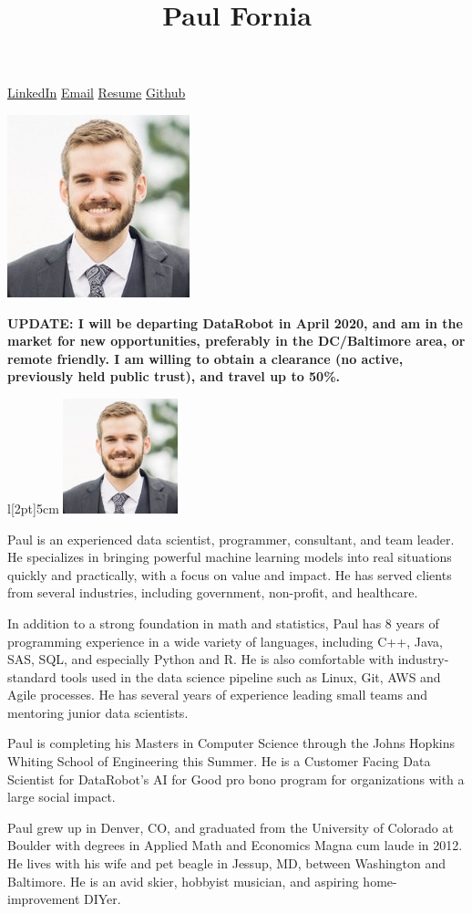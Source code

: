 \documentclass[]{article}
\title{Paul Fornia}
\author{}
\date{}
\begin{document}
\maketitle

\href{https://www.linkedin.com/in/paulfornia/}{LinkedIn} \textbar{}
\href{mailto:paulfornia@gmail.com}{Email} \textbar{}
\href{./Resume_Fornia_2020_03_28.pdf}{Resume} \textbar{}
\href{https://github.com/pfornia}{Github}

\includegraphics{headshot.jpeg}

\textbf{UPDATE: I will be departing DataRobot in April 2020, and am in
the market for new opportunities, preferably in the DC/Baltimore area,
or remote friendly. I am willing to obtain a clearance (no active,
previously held public trust), and travel up to 50\%.}

\begin{wrapfig}[12]{l}[2pt]{5cm}
\includegraphics[width=0.25\textwidth]{headshot.jpeg}
\end{wrapfig}

Paul is an experienced data scientist, programmer, consultant, and team
leader. He specializes in bringing powerful machine learning models into
real situations quickly and practically, with a focus on value and
impact. He has served clients from several industries, including
government, non-profit, and healthcare.

In addition to a strong foundation in math and statistics, Paul has 8
years of programming experience in a wide variety of languages,
including C++, Java, SAS, SQL, and especially Python and R. He is also
comfortable with industry-standard tools used in the data science
pipeline such as Linux, Git, AWS and Agile processes. He has several
years of experience leading small teams and mentoring junior data
scientists.

Paul is completing his Masters in Computer Science through the Johns
Hopkins Whiting School of Engineering this Summer. He is a Customer
Facing Data Scientist for DataRobot's AI for Good pro bono program for
organizations with a large social impact.

Paul grew up in Denver, CO, and graduated from the University of
Colorado at Boulder with degrees in Applied Math and Economics Magna cum
laude in 2012. He lives with his wife and pet beagle in Jessup, MD,
between Washington and Baltimore. He is an avid skier, hobbyist
musician, and aspiring home-improvement DIYer.
\end{document}
